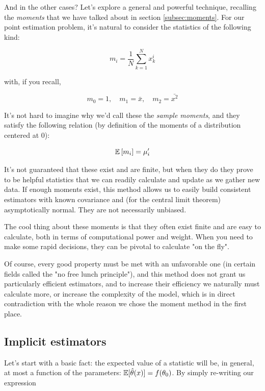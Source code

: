 And in the other cases? Let's explore a general and powerful technique, recalling the \emph{moments} that we have talked about in section \ref{subsec:moments}. For our point estimation problem, it's natural to consider the statistics of the following kind:

	\[
	m_i = \frac{1}{N} \sum_{k=1}^{N}x_k^i
	\]
	
with, if you recall,

	\[
	m_0 = 1,\quad m_1=\bar{x}, \quad m_2 = \bar{x^2}
	\]
	
It's not hard to imagine why we'd call these the \emph{sample moments}, and they satisfy the following relation (by definition of the moments of a distribution centered at $0$):

	\[
	\mathbb{E}\left[m_i\right] = \mu_i^\prime
	\]

It's not guaranteed that these exist and are finite, but when they do they prove to be helpful statistics that we can readily calculate and update as we gather new data. If enough moments exist, this method allows us to easily build consistent estimators with known covariance and (for the central limit theorem) asymptotically normal. They are not necessarily unbiased.

The cool thing about these moments is that they often exist finite and are easy to calculate, both in terms of computational power and weight. When you need to make some rapid decisions, they can be pivotal to calculate "on the fly". 

Of course, every good property must be met with an unfavorable one (in certain fields called the "no free lunch principle"), and this method does not grant us particularly efficient estimators, and to increase their efficiency we naturally must calculate more, or increase the complexity of the model, which is in direct contradiction with the whole reason we chose the moment method in the first place.

\subsection{Implicit estimators}
\label{subsec:Implicits}
Let's start with a basic fact: the expected value of a statistic will be, in general, at most a function of the parameters: $\mathbb{E}[\hat\theta(x)]  = f(\theta_0)$. By simply re-writing our expression

